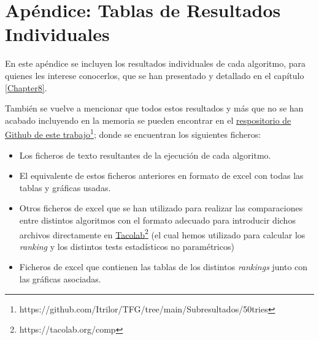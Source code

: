 \chapter{Apéndice: Tablas de Resultados Individuales}

En este apéndice se incluyen los resultados individuales de cada algoritmo, para quienes les interese conocerlos, que se han presentado y detallado en el capítulo \ref{Chapter8}. 

También se vuelve a mencionar que todos estos resultados y más que no se han acabado incluyendo en la memoria se pueden encontrar en el \href{https://github.com/Itrilor/TFG/tree/main/Subresultados/50tries}{respositorio de Github de este trabajo}\footnote{https://github.com/Itrilor/TFG/tree/main/Subresultados/50tries}; 
donde se encuentran los siguientes ficheros:
\begin{itemize}
	\item Los ficheros de texto resultantes de la ejecución de cada  algoritmo.
	\item El equivalente de estos ficheros anteriores en formato de excel con todas las tablas y gráficas usadas. 
	\item Otros  ficheros de excel que se han utilizado para realizar las comparaciones entre distintos algoritmos con el formato adecuado para introducir dichos archivos directamente en \href{https://tacolab.org/comp}{Tacolab}\footnote{https://tacolab.org/comp} (el cual hemos utilizado para calcular los \textit{ranking} y los distintos tests estadísticos no paramétricos)
	\item Ficheros de excel que contienen las tablas de los distintos \textit{rankings} junto con las gráficas asociadas. 
\end{itemize}

